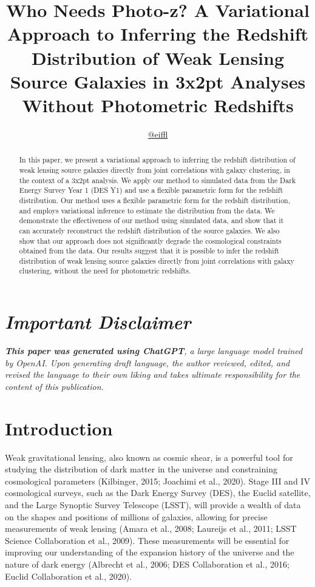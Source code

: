 \documentclass[twocolumn,draft]{aastex631}
\begin{document}
\title{Who Needs Photo-z? A Variational Approach to Inferring the Redshift Distribution of Weak Lensing Source Galaxies in 3x2pt Analyses Without Photometric Redshifts}

\author{\href{https://github.com/EiffL}{@eiffl}}

\begin{abstract}
In this paper, we present a variational approach to inferring the redshift distribution of weak lensing source galaxies directly from joint correlations with galaxy clustering, in the context of a 3x2pt analysis. We apply our method to simulated data from the Dark Energy Survey Year 1 (DES Y1) and use a flexible parametric form for the redshift distribution. Our method uses a flexible parametric form for the redshift distribution, and employs variational inference to estimate the distribution from the data. We demonstrate the effectiveness of our method using simulated data, and show that it can accurately reconstruct the redshift distribution of the source galaxies. We also show that our approach does not significantly degrade the cosmological constraints obtained from the data. Our results suggest that it is possible to infer the redshift distribution of weak lensing source galaxies directly from joint correlations with galaxy clustering, without the need for photometric redshifts.
\end{abstract}

\section*{\textit{\textbf{Important Disclaimer}}}
\textit{\textbf{This paper was generated using ChatGPT}, a large language model trained by OpenAI. Upon generating draft language, the author reviewed, edited, and revised the language to their own liking and takes ultimate responsibility for the content of this publication.}


\section{Introduction}
\label{sec:intro}

Weak gravitational lensing, also known as cosmic shear, is a powerful tool for studying the distribution of dark matter in the universe and constraining cosmological parameters (Kilbinger, 2015; Joachimi et al., 2020). Stage III and IV cosmological surveys, such as the Dark Energy Survey (DES), the Euclid satellite, and the Large Synoptic Survey Telescope (LSST), will provide a wealth of data on the shapes and positions of millions of galaxies, allowing for precise measurements of weak lensing (Amara et al., 2008; Laureijs et al., 2011; LSST Science Collaboration et al., 2009). These measurements will be essential for improving our understanding of the expansion history of the universe and the nature of dark energy (Albrecht et al., 2006; DES Collaboration et al., 2016; Euclid Collaboration et al., 2020).
\end{document}
